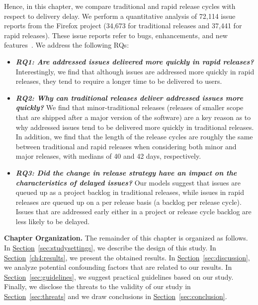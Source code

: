 Hence, in this chapter, we compare traditional and rapid release cycles with
respect to delivery delay. We perform a quantitative analysis of 72,114 issue
reports from the Firefox project (34,673 for traditional releases and 37,441 for
rapid releases). These issue reports refer to bugs, enhancements, and new
features~\cite{giuliano2008}. We address the following RQs:
%

\begin{itemize}

	\item \textbf{\textit{RQ1: Are addressed issues delivered more quickly
		in rapid releases?}} Interestingly, we find that although issues
		are addressed more quickly in rapid releases, they tend to
		require a longer time to be delivered to users.\\

	\item \textbf{\textit{RQ2: Why can traditional releases deliver
		addressed issues more quickly?}} We find that minor-traditional
		releases (\ie releases of smaller scope that are shipped after a
		major version of the software) are a key reason as to why
		addressed issues tend to be delivered more quickly in
		traditional releases. In addition, we find that the length of
		the release cycles are roughly the same between traditional and
		rapid releases when considering both minor and major releases,
		with medians of 40 and 42 days, respectively.\\

	\item \textbf{\textit{RQ3: Did the change in release strategy have an
		impact on the characteristics of delayed issues?}} Our models
		suggest that issues are queued up as a project backlog in
		traditional releases, while issues in rapid releases are queued
		up on a per release basis (\ie a backlog per release cycle).
		Issues that are addressed early either in a project or release
		cycle backlog are less likely to be delayed.
\end{itemize}  

\noindent \textbf{Chapter Organization.} The remainder of this chapter is
organized as follows. In
\hyperref[sec:studysettings]{Section}~\ref{sec:studysettings}, we describe the
design of this study. In \hyperref[ch4:results]{Section}~\ref{ch4:results}, we
present the obtained results. In
\hyperref[sec:discussion]{Section}~\ref{sec:discussion}, we analyze potential
confounding factors that are related to our results. In
\hyperref[sec:guidelines]{Section}~\ref{sec:guidelines}, we suggest practical
guidelines based on our study. Finally, we disclose the threats to the validity
of our study in \hyperref[sec:threats]{Section}~\ref{sec:threats} and we draw
conclusions in \hyperref[sec:conclusion]{Section}~\ref{sec:conclusion}. 


